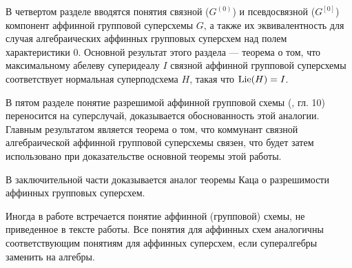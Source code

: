 В четвертом разделе вводятся понятия связной ($ G^{(0)}$) и псевдосвязной ($ G^{[0]}$)
компонент аффинной групповой суперсхемы $ G $, а также их эквивалентность
для случая алгебраических аффинных групповых суперсхем над полем характеристики 0.
Основной результат этого раздела --- теорема о том, что максимальному
абелеву суперидеалу $ I $ связной аффинной групповой суперсхемы соответствует
нормальная суперподсхема $ H $, такая что $ \mathrm{Lie}(H) = I $.

В пятом разделе понятие разрешимой аффинной групповой схемы
(\cite{waterhouse}, гл. 10) переносится на суперслучай, доказывается
обоснованность этой аналогии. Главным результатом является теорема о том, что
коммунант связной алгебраической аффинной групповой суперсхемы связен,
что будет затем использовано при доказательстве основной теоремы этой работы.

В заключительной части доказывается аналог теоремы Каца о разрешимости
аффинных групповых суперсхем.

Иногда в работе встречается понятие аффинной (групповой) схемы, не приведенное
в тексте работы. Все понятия для аффинных схем аналогичны соответствующим
понятиям для аффинных суперсхем, если супералгебры заменить на алгебры.
